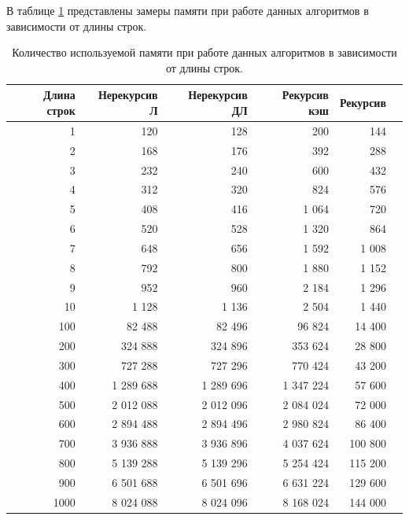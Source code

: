 В таблице \ref{tab:tabM} представлены замеры памяти при работе данных алгоритмов в зависимости
от длины строк.

\begin{table}[!ht]
    \small
    \centering
    \caption{\label{tab:tabM} Количество используемой памяти при работе данных алгоритмов
    в зависимости от длины строк.}
    \begin{tabular}{|r|r|r|r|r|r|}
    \hline
        Длина строк & Нерекурсив Л & Нерекурсив ДЛ & Рекурсив кэш & Рекурсив\\ \hline
        1 & 120 & 128 & 200 & 144  \\ \hline
        2 & 168 & 176 & 392 & 288  \\ \hline
        3 & 232 & 240 & 600 & 432  \\ \hline
        4 & 312 & 320 & 824 & 576  \\ \hline
        5 & 408 & 416 & 1 064 & 720  \\ \hline
        6 & 520 & 528 & 1 320 & 864  \\ \hline
        7 & 648 & 656 & 1 592 & 1 008  \\ \hline
        8 & 792 & 800 & 1 880 & 1 152  \\ \hline
        9 & 952 & 960 & 2 184 & 1 296  \\ \hline
        10 & 1 128 & 1 136 & 2 504 & 1 440  \\ \hline
        100 & 82 488 & 82 496 & 96 824 & 14 400  \\ \hline
        200 & 324 888 & 324 896 & 353 624 & 28 800  \\ \hline
        300 & 727 288 & 727 296 & 770 424 & 43 200  \\ \hline
        400 & 1 289 688 & 1 289 696 & 1 347 224 & 57 600  \\ \hline
        500 & 2 012 088 & 2 012 096 & 2 084 024 & 72 000  \\ \hline
        600 & 2 894 488 & 2 894 496 & 2 980 824 & 86 400  \\ \hline
        700 & 3 936 888 & 3 936 896 & 4 037 624 & 100 800  \\ \hline
        800 & 5 139 288 & 5 139 296 & 5 254 424 & 115 200  \\ \hline
        900 & 6 501 688 & 6 501 696 & 6 631 224 & 129 600  \\ \hline
        1000 & 8 024 088 & 8 024 096 & 8 168 024 & 144 000 \\ \hline
    \end{tabular}
\end{table}

